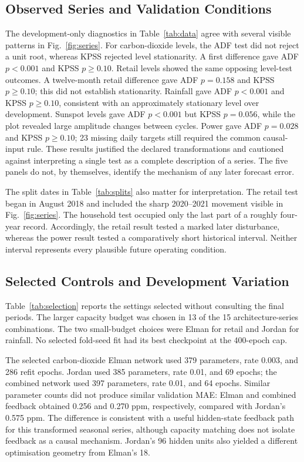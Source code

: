 \subsection{Observed Series and Validation Conditions}
The development-only diagnostics in Table~\ref{tab:data} agree with several visible patterns in Fig.~\ref{fig:series}. For carbon-dioxide levels, the ADF test did not reject a unit root, whereas KPSS rejected level stationarity. A first difference gave ADF $p<0.001$ and KPSS $p\geq0.10$. Retail levels showed the same opposing level-test outcomes. A twelve-month retail difference gave ADF $p=0.158$ and KPSS $p\geq0.10$; this did not establish stationarity. Rainfall gave ADF $p<0.001$ and KPSS $p\geq0.10$, consistent with an approximately stationary level over development. Sunspot levels gave ADF $p<0.001$ but KPSS $p=0.056$, while the plot revealed large amplitude changes between cycles. Power gave ADF $p=0.028$ and KPSS $p\geq0.10$; 23 missing daily targets still required the common causal-input rule. These results justified the declared transformations and cautioned against interpreting a single test as a complete description of a series. The five panels do not, by themselves, identify the mechanism of any later forecast error.

The split dates in Table~\ref{tab:splits} also matter for interpretation. The retail test began in August 2018 and included the sharp 2020--2021 movement visible in Fig.~\ref{fig:series}. The household test occupied only the last part of a roughly four-year record. Accordingly, the retail result tested a marked later disturbance, whereas the power result tested a comparatively short historical interval. Neither interval represents every plausible future operating condition.

\subsection{Selected Controls and Development Variation}
Table~\ref{tab:selection} reports the settings selected without consulting the final periods. The larger capacity budget was chosen in 13 of the 15 architecture-series combinations. The two small-budget choices were Elman for retail and Jordan for rainfall. No selected fold-seed fit had its best checkpoint at the 400-epoch cap.



The selected carbon-dioxide Elman network used 379 parameters, rate 0.003, and 286 refit epochs. Jordan used 385 parameters, rate 0.01, and 69 epochs; the combined network used 397 parameters, rate 0.01, and 64 epochs. Similar parameter counts did not produce similar validation MAE: Elman and combined feedback obtained 0.256 and 0.270 ppm, respectively, compared with Jordan's 0.575 ppm. The difference is consistent with a useful hidden-state feedback path for this transformed seasonal series, although capacity matching does not isolate feedback as a causal mechanism. Jordan's 96 hidden units also yielded a different optimisation geometry from Elman's 18.

